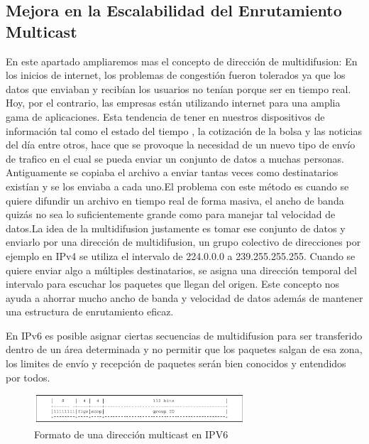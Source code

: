 \documentclass[11pt,a4paper]{article}
\begin{document}
\subsection{Mejora en la Escalabilidad del Enrutamiento Multicast}
En este apartado ampliaremos mas el concepto de dirección de multidifusion: En los inicios de internet, los 
problemas de congestión fueron tolerados ya que los datos que enviaban y recibían los usuarios no tenían porque 
ser en tiempo real. Hoy, por el contrario, las empresas están utilizando internet para una amplia gama de 
aplicaciones. Esta tendencia de tener en nuestros dispositivos de información tal como el estado del tiempo , 
la 
cotización de la bolsa y las noticias del día entre otros, hace que se provoque la necesidad de un nuevo tipo 
de envío de trafico en el cual se pueda enviar 
un conjunto de datos a muchas personas. Antiguamente se copiaba el archivo a enviar tantas veces como 
destinatarios existían y se los enviaba a cada uno.El problema con este método es cuando se quiere difundir un 
archivo en tiempo real de forma masiva, el ancho de banda quizás no sea lo suficientemente grande como para 
manejar tal velocidad de datos.La idea de la multidifusion justamente es tomar ese conjunto de datos y enviarlo 
por una dirección de multidifusion, un grupo colectivo de direcciones por ejemplo en IPv4 se utiliza el 
intervalo de 
224.0.0.0 a 239.255.255.255. Cuando se quiere enviar algo a múltiples destinatarios, se asigna una dirección 
temporal del intervalo para escuchar los paquetes que llegan del origen. Este concepto nos ayuda a ahorrar 
mucho 
ancho de banda y velocidad de datos además de mantener una estructura de enrutamiento eficaz.\par
En IPv6 es posible asignar ciertas secuencias de multidifusion para ser transferido dentro de un área 
determinada y no permitir que los paquetes salgan de esa zona, los limites de envío y recepción de paquetes 
serán bien conocidos y entendidos por todos.

\begin{figure}[h!]
 \centering
 \includegraphics[width=0.7\textwidth]{formato_multicast.png}
 \caption[Formato Multicast]{Formato de una dirección multicast en IPV6}
\end{figure} \par
\end{document}
